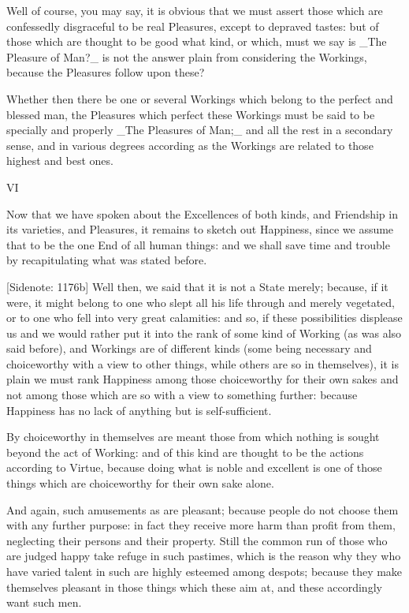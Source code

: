 Well of course, you may say, it is obvious that we must assert those
which are confessedly disgraceful to be real Pleasures, except to
depraved tastes: but of those which are thought to be good what kind,
or which, must we say is _The Pleasure of Man?_ is not the answer plain
from considering the Workings, because the Pleasures follow upon these?

Whether then there be one or several Workings which belong to the
perfect and blessed man, the Pleasures which perfect these Workings must
be said to be specially and properly _The Pleasures of Man;_ and all
the rest in a secondary sense, and in various degrees according as the
Workings are related to those highest and best ones.


VI

Now that we have spoken about the Excellences of both kinds, and
Friendship in its varieties, and Pleasures, it remains to sketch out
Happiness, since we assume that to be the one End of all human things:
and we shall save time and trouble by recapitulating what was stated
before.

[Sidenote: 1176b] Well then, we said that it is not a State merely;
because, if it were, it might belong to one who slept all his life
through and merely vegetated, or to one who fell into very great
calamities: and so, if these possibilities displease us and we would
rather put it into the rank of some kind of Working (as was also said
before), and Workings are of different kinds (some being necessary
and choiceworthy with a view to other things, while others are so in
themselves), it is plain we must rank Happiness among those choiceworthy
for their own sakes and not among those which are so with a view to
something further: because Happiness has no lack of anything but is
self-sufficient.

By choiceworthy in themselves are meant those from which nothing is
sought beyond the act of Working: and of this kind are thought to be the
actions according to Virtue, because doing what is noble and excellent
is one of those things which are choiceworthy for their own sake alone.

And again, such amusements as are pleasant; because people do not choose
them with any further purpose: in fact they receive more harm than
profit from them, neglecting their persons and their property. Still the
common run of those who are judged happy take refuge in such pastimes,
which is the reason why they who have varied talent in such are highly
esteemed among despots; because they make themselves pleasant in those
things which these aim at, and these accordingly want such men.

